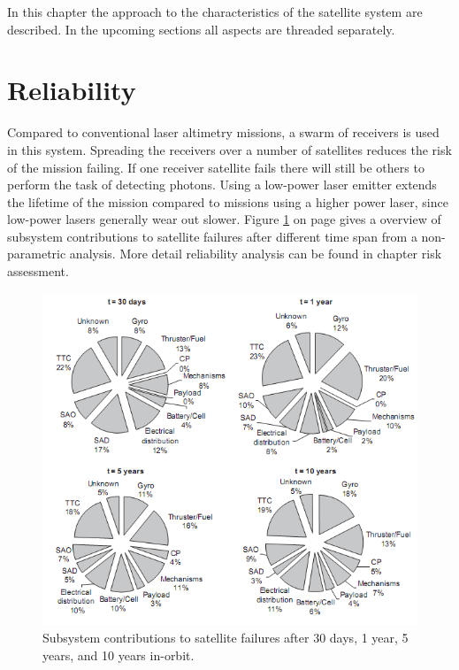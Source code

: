 
In this chapter the approach to the  characteristics of the satellite system are described. In the upcoming sections all aspects are threaded separately. 

\section{Reliability}
\label{blRAMSrel}
Compared to conventional laser altimetry missions, a swarm of receivers is used in this system. Spreading the receivers over a number of satellites reduces the risk of the mission failing. If one receiver satellite fails there will still be others to perform the task of detecting photons. Using a low-power laser emitter extends the lifetime of the mission compared to missions using a higher power laser, since low-power lasers generally wear out slower. Figure \ref{R} on page \pageref{R} gives a overview of subsystem contributions to satellite failures after different time span from a non-parametric analysis. More detail reliability analysis can be found in chapter risk assessment.
\begin{figure} [H]
	\begin{center}
         \includegraphics[scale=1]{chapters/img/subsystem_reliability_analysis.png}
	
	\caption{Subsystem contributions to satellite failures after 30 days, 1 year, 5 years, and 10 years in-orbit.\cite{reliability}}
	\label{R}
	\end{center}
	\end{figure}

